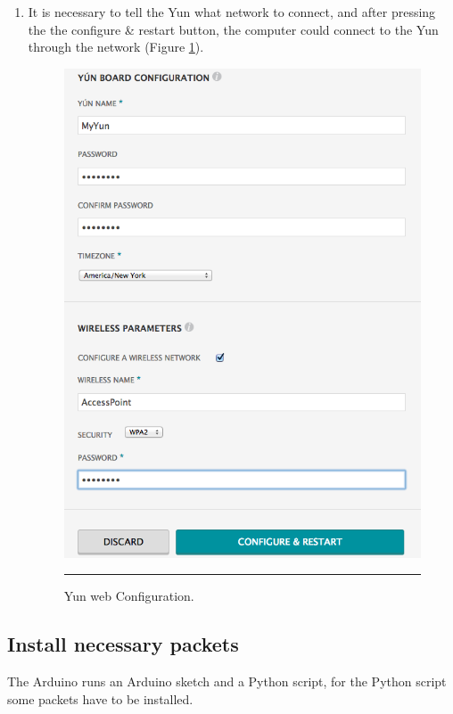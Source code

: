 \documentclass[12pt, a4paper,twoside]{tesi_upf}
\begin{document}
\begin{enumerate}
        \item It is necessary to tell the Yun what network to connect, and after pressing the the configure \& restart button, the computer could connect to the Yun through the network (Figure \ref{fig:YunWebConfig}).
          \begin{figure}[htbp]
            \centering
                \includegraphics[scale=0.3]{./Figures/YunWebConfig.png}
                \\
                \rule{15em}{0.5pt}
            \caption[Yun web Configuration]{Yun web Configuration.}
            \label{fig:YunWebConfig}
          \end{figure}
        
      \end{enumerate}
  \subsection{Install necessary packets}
    The Arduino runs an Arduino sketch and a Python script, for the Python script some packets have to be installed.
    
\end{document}
